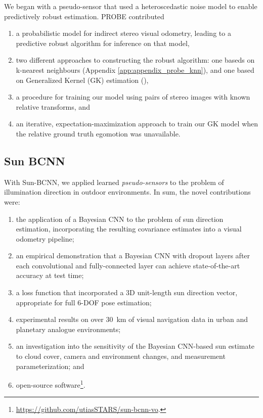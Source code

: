 We began with a pseudo-sensor that used a heteroscedastic noise model to enable predictively robust estimation. PROBE contributed
\begin{enumerate}
\item a probabilistic model for indirect stereo visual odometry, leading to a predictive robust algorithm for inference on that model,
\item two different approaches to constructing the robust algorithm: one baseds on k-nearest neighbours (Appendix \ref{app:appendix_probe_knn}), and one based on Generalized Kernel (GK) estimation (),
\item a procedure for training our model using pairs of stereo images with known relative transforms, and
\item an iterative, expectation-maximization approach to train our GK model when the relative ground truth egomotion was unavailable.
\end{enumerate}



\subsection{Sun BCNN}




With Sun-BCNN, we applied learned \textit{pseudo-sensors} to the problem of illumination direction in outdoor environments. In sum, the novel contributions were:
\begin{enumerate}
\item the application of a Bayesian CNN to the problem of sun direction estimation, incorporating the resulting covariance estimates into a visual odometry pipeline; 
\item an empirical demonstration that a Bayesian CNN with dropout layers after each convolutional and fully-connected layer can achieve state-of-the-art accuracy at test time;
\item a loss function that incorporated a 3D unit-length sun direction vector, appropriate for full 6-DOF pose estimation;
\item experimental results on over 30~km of visual navigation data in urban \citep{Geiger2013-ky} and planetary analogue \citep{Furgale2012-kk} environments; 
\item an investigation into the sensitivity of the Bayesian CNN-based sun estimate to cloud cover, camera and environment changes, and measurement parameterization; and
\item open-source software\footnote{\url{https://github.com/utiasSTARS/sun-bcnn-vo}.}.
\end{enumerate}

